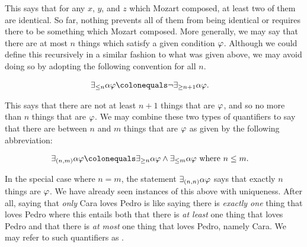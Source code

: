 This says that for any $x$, $y$, and $z$ which Mozart composed, at least two of them are identical. 
So far, nothing prevents all of them from being identical or requires there to be something which Mozart composed. 
%
%
More generally, we may say that there are at most $n$ things which satisfy a given condition $\varphi$.
Although we could define this recursively in a similar fashion to what was given above, we may avoid doing so by adopting the following convention for all $n$.

\vspace{-.2in}
\begin{align*}
  \qt{\exists_{\leq n}}{\alpha}\metaA &\colonequals \neg\qt{\exists_{\geq n+1}}{\alpha}\metaA.
\end{align*}
\vspace{-.2in}

This says that there are not at least $n+1$ things that are $\varphi$, and so no more than $n$ things that are $\varphi$. 
We may combine these two types of quantifiers to say that there are between $n$ and $m$ things that are $\varphi$ as given by the following abbreviation: 

\vspace{-.2in}
\begin{align*}
  \qt{\exists_{(n,m)}}{\alpha}\metaA &\colonequals \qt{\exists_{\geq n}}{\alpha}\metaA \eand \qt{\exists_{\leq m}}{\alpha}\metaA \text{ where } n\leq m.
\end{align*}
\vspace{-.2in}

In the special case where $n=m$, the statement $\exists_{(n,n)} \alpha\varphi$ says that exactly $n$ things are $\varphi$. 
We have already seen instances of this above with uniqueness.
After all, saying that \textit{only} Cara loves Pedro is like saying there is \textit{exactly one} thing that loves Pedro where this entails both that there is \textit{at least} one thing that loves Pedro and that there is \textit{at most} one thing that loves Pedro, namely Cara.
We may refer to such quantifiers as .

